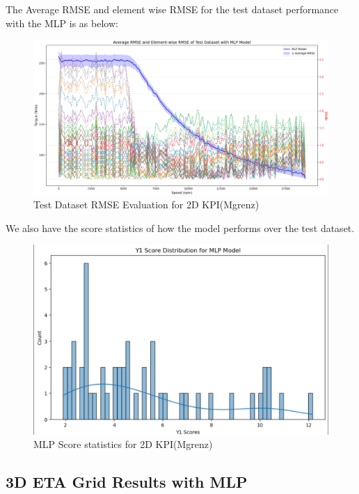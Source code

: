 \documentclass{report} %
\begin{document}
The Average RMSE and element wise RMSE for the test dataset performance with the \ac{MLP} is as below: \\

\begin{figure}[H]
    \centering
    \includegraphics[width=1\textwidth]{./ReportImages/avgrmse_y1.png} 
    \caption{Test Dataset RMSE Evaluation for 2D KPI(Mgrenz)} 
    \label{fig:Test Dataset RMSE Evaluation for 2D KPI(Mgrenz)}
\end{figure}

We also have the score statistics of how the model performs over the test dataset.\\

\begin{figure}[H]
    \centering
    \includegraphics[width=1\textwidth]{./ReportImages/score_mlp_y1.png} 
    \caption{MLP Score statistics for 2D KPI(Mgrenz)} 
    \label{fig:MLP Score statistics for 2D KPI(Mgrenz)}
\end{figure}

\subsection{3D ETA Grid Results with \ac{MLP}}\label{sec:3D ETA Grid Results with MLP}
\end{document}
